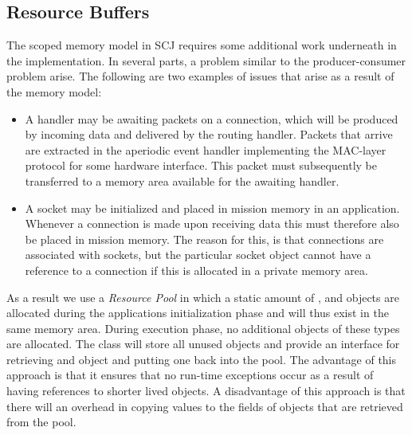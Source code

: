 \subsection{Resource Buffers}
The scoped memory model in SCJ requires some additional work underneath in the implementation. In several parts, a problem similar to the producer-consumer problem arise. The following are two examples of issues that arise as a result of the memory model:
\begin{itemize}
	\item A handler may be awaiting packets on a connection, which will be produced by incoming data and delivered by the routing handler. Packets that arrive are extracted in the aperiodic event handler implementing the MAC-layer protocol for some hardware interface. This packet must subsequently be transferred to a memory area available for the awaiting handler.
	\item A socket may be initialized and placed in mission memory in an application. Whenever a connection is made upon receiving data this must therefore also be placed in mission memory. The reason for this, is that connections are associated with sockets, but the particular socket object cannot have a reference to a connection if this is allocated in a private memory area.
\end{itemize}

As a result we use a \textit{Resource Pool}\cite{Rios:2012:PSJ:2388936.2388938} in which a static amount of ,  and  objects are allocated during the applications initialization phase and will thus exist in the same memory area. During execution phase, no additional objects of these types are allocated. The class  will store all unused objects and provide an interface for retrieving and object and putting one back into the pool. The advantage of this approach is that it ensures that no run-time exceptions occur as a result of having references to shorter lived objects. A disadvantage of this approach is that there will an overhead in copying values to the fields of objects that are retrieved from the pool. 